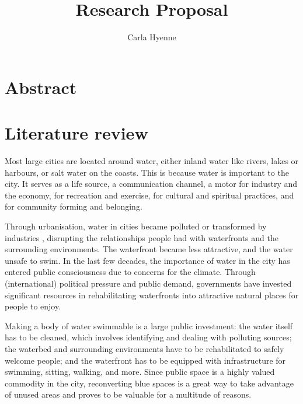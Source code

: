 \documentclass{article}
\title{Research Proposal}
\author{Carla Hyenne}
\date{}
\begin{document}
\maketitle

\tableofcontents 


\section{Abstract}


\pagebreak
\section{Literature review}

Most large cities are located around water, either inland water like rivers, lakes or harbours, or salt water on the coasts.
This is because water is important to the city. It serves as a life source, a communication channel, a motor for industry and the economy, for recreation and exercise, for cultural and spiritual practices, and for community forming and belonging.

Through urbanisation, water in cities became polluted or transformed by industries \parencite{kampa_langaas_anzaldua_2016}, disrupting the relationships people had with waterfronts and the surrounding environments. The waterfront became less attractive, and the water unsafe to swim.
In the last few decades, the importance of water in the city has entered public consciousness due to concerns for the climate. Through (international) political pressure and public demand, governments have invested significant resources in rehabilitating waterfronts into attractive natural places for people to enjoy.

Making a body of water swimmable is a large public investment: the water itself has to be cleaned, which involves identifying and dealing with polluting sources; the waterbed and surrounding environments have to be rehabilitated to safely welcome people; and the waterfront has to be equipped with infrastructure for swimming, sitting, walking, and more. Since public space is a highly valued commodity in the city, reconverting blue spaces is a great way to take advantage of unused areas and proves to be valuable for a multitude of reasons. 
\end{document}
